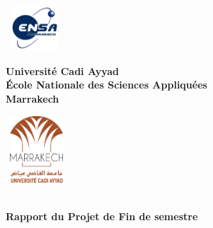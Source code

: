 \newpage
\pagestyle{empty}
\begin{center}
	\begin{minipage}{2.5cm}
	\begin{center}
		\includegraphics[width=2.2cm,height=1.7cm]{cover/assets/ensa-marrakech-logo.png}
	\end{center}
\end{minipage}\hfill
\begin{minipage}{10cm}
	\begin{center}
	\textbf{ Université Cadi Ayyad}\\[0.1cm]
    \textbf{\uppercase{é}cole Nationale des Sciences Appliquées}\\[0.1cm]
    \textbf{Marrakech}
	\end{center}
\end{minipage}\hfill
\begin{minipage}{2.5cm}
	\begin{center}
	\includegraphics[width=2.3cm,height=2.5cm]{cover/assets/uca-logo.png}
	\end{center}

\end{minipage}
\textsc{\Large }\\[4.2cm]
{\large \bfseries Rapport du Projet de Fin de semestre}\\[2.2cm]



\end{center}
